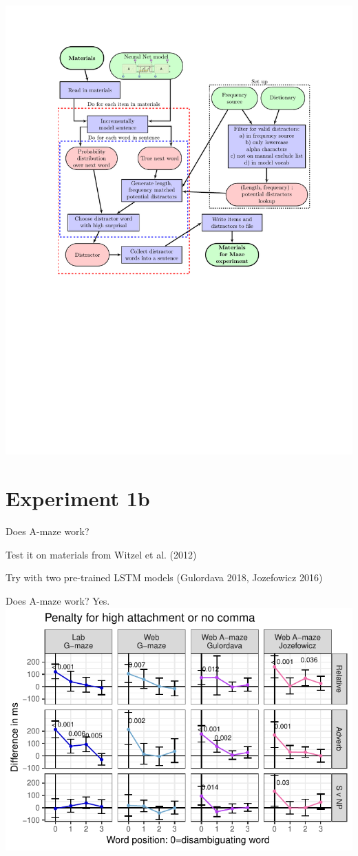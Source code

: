 \documentclass[12pt, xcolor=beamer,table,usenames,dvipsnames, ignorenonframetext, ngerman]{beamer}
\begin{document}
\begin{frame}
\centering
\includegraphics[clip, trim=3.25cm 5cm 2.5cm 2.5cm,width=.9\textwidth]{flow_2.pdf}
\end{frame}
\section{Experiment 1b}

\begin{frame}{Does A-maze work? }

Test it on materials from Witzel et al. (2012)
\medskip

Try with two pre-trained LSTM models (Gulordava 2018, Jozefowicz 2016)

\end{frame}

\begin{frame}{Does A-maze work?  Yes.} \pause
\includegraphics[width=1\textwidth]{a_all.pdf}
\end{frame}
\end{document}
